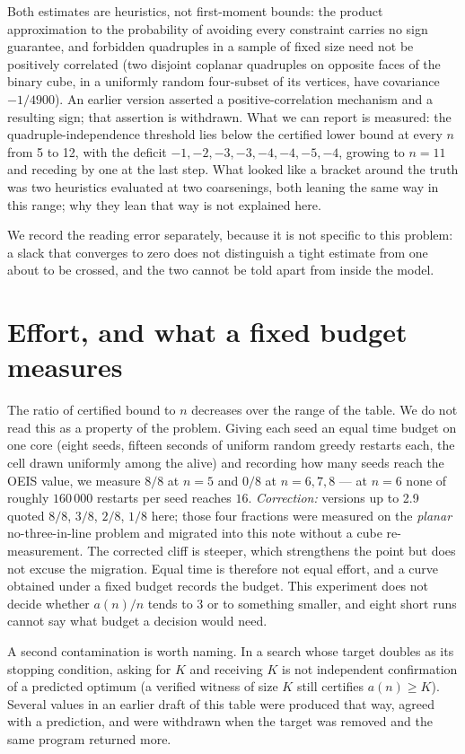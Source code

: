 \documentclass[11pt,a4paper]{article}
\begin{document}
Both estimates are heuristics, not first-moment bounds: the product approximation to the probability
of avoiding every constraint carries no sign guarantee, and forbidden quadruples in a sample of fixed
size need not be positively correlated (two disjoint coplanar quadruples on opposite faces of the
binary cube, in a uniformly random four-subset of its vertices, have covariance $-1/4900$).  An earlier
version asserted a positive-correlation mechanism and a resulting sign; that assertion is withdrawn.
What we can report is measured: the quadruple-independence threshold lies below the certified lower
bound at every $n$ from 5 to 12, with the deficit $-1,-2,-3,-3,-4,-4,-5,-4$, growing to $n=11$ and
receding by one at the last step.  What looked like a bracket around the truth was two heuristics
evaluated at two coarsenings, both leaning the same way in this range; why they lean that way is not
explained here.

We record the reading error separately, because it is not specific to this problem: a slack that
converges to zero does not distinguish a tight estimate from one about to be crossed, and the two
cannot be told apart from inside the model.

\section{Effort, and what a fixed budget measures}\label{s:effort}
The ratio of certified bound to $n$ decreases over the range of the table.  We do not read this
as a property of the problem.  Giving each seed an equal time budget on one core (eight seeds, fifteen seconds of uniform random
greedy restarts each, the cell drawn uniformly among the alive) and recording how many seeds reach
the OEIS value, we measure $8/8$ at $n=5$ and $0/8$ at $n=6,7,8$ --- at $n=6$ none of roughly
$160\,000$ restarts per seed reaches $16$.  \emph{Correction:} versions up to 2.9 quoted
$8/8$, $3/8$, $2/8$, $1/8$ here; those four fractions were measured on the \emph{planar}
no-three-in-line problem and migrated into this note without a cube re-measurement.  The corrected
cliff is steeper, which strengthens the point but does not excuse the migration.
Equal time is therefore not equal effort, and a curve obtained under a fixed budget records the
budget.  This experiment does not decide whether $a(n)/n$ tends to $3$ or to something smaller,
and eight short runs cannot say what budget a decision would need.

A second contamination is worth naming.  In a search whose target doubles as its stopping
condition, asking for $K$ and receiving $K$ is not independent confirmation of a predicted optimum
(a verified witness of size $K$ still certifies $a(n)\ge K$).  Several values in an
earlier draft of this table were produced that way, agreed with a prediction, and were withdrawn
when the target was removed and the same program returned more.
\end{document}
